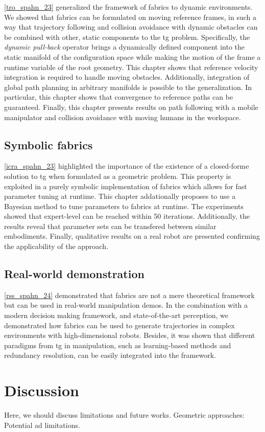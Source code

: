 \cref{tro_spahn_23} generalized the framework of \ac{fabrics} to dynamic
environments. We showed that \ac{fabrics} can be formulated on moving reference
frames, in such a way that trajectory following and collision avoidance with
dynamic obstacles can be combined with other, static components to the \ac{tg}
problem. Specifically, the \textit{dynamic pull-back}
operator brings a dynamically defined component into the static manifold of the
configuration space while making the motion of the frame a runtime variable of
the root geometry. This chapter shows that reference velocity integration is
required to handle moving obstacles. Additionally, integration of global path
planning in arbitrary manifolds is possible to the generalization. In
particular, this chapter shows that convergence to reference paths can be 
guaranteed. Finally, this chapter presents results on path following with a
mobile manipulator and collision avoidance with moving humans in the workspace.


\subsection{Symbolic fabrics}
\label{sec:conclusion_symbolic_fabrics}

\cref{icra_spahn_23} highlighted the importance of the existence of a
closed-forme solution to \ac{tg} when formulated as a geometric problem.
This property is exploited in a purely symbolic implementation of \ac{fabrics}
which allows for fast parameter tuning at runtime. This chapter addationally
proposes to use a Bayesian method to tune parameters to \ac{fabrics} at runtime.
The experiments showed that expert-level can be reached within 50 iterations.
Additionally, the results reveal that parameter sets can be transfered between
similar embodiments. Finally, qualitative results on a real robot are presented
confirming the applicability of the approach.

\subsection{Real-world demonstration}
\label{sec:conclusion_real_world}

\cref{rss_spahn_24} demonstrated that \ac{fabrics} are not a mere theoretical
framework but can be used in real-world manipulation demos. In the combination
with a modern decision making framework, and state-of-the-art perception, 
we demonstrated how \ac{fabrics} can be used to generate trajectories in complex
environments with high-dimensional robots. Besides, it was shown that different
paradigms from \ac{tg} in manipulation, such as learning-based methods and
redundancy resolution, can be easily integrated into the framework.






\section{Discussion}
\label{sec:discussion}

Here, we should discuss limitations and future works.
Geometric approaches: Potential ad limitations.




